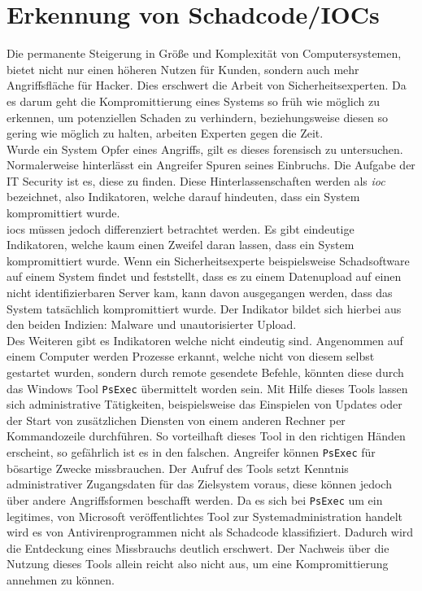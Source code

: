 \documentclass[
    12pt, %
    DIV10,
    ngerman, %
    a4paper, %
    oneside, %
    titlepage, %
    parskip=half, %
    headings=normal, %
    listof=totoc, %
    bibliography=totoc, %
    index=totoc, %
    captions=tableheading, %
    final %
]{scrreprt}
\begin{document}
\chapter{Erkennung von Schadcode/IOCs}\label{sec:ioc}
Die permanente Steigerung in Grö{\ss}e und Komplexität von Computersystemen, bietet nicht nur einen höheren Nutzen für Kunden, sondern auch mehr Angriffsfläche für Hacker. Dies erschwert die Arbeit von Sicherheitsexperten. Da es darum geht die Kompromittierung eines Systems so früh wie möglich zu erkennen, um potenziellen Schaden zu verhindern, beziehungsweise diesen so gering wie möglich zu halten, arbeiten Experten gegen die Zeit.\\
Wurde ein System Opfer eines Angriffs, gilt es dieses forensisch zu untersuchen. Normalerweise hinterlässt ein Angreifer Spuren seines Einbruchs. Die Aufgabe der IT Security ist es, diese zu finden. Diese Hinterlassenschaften werden als \emph{\acf{ioc}} bezeichnet, also Indikatoren, welche darauf hindeuten, dass ein System kompromittiert wurde.\\
%
\ac{iocs} müssen jedoch differenziert betrachtet werden. Es gibt eindeutige Indikatoren, welche kaum einen Zweifel daran lassen, dass ein System kompromittiert wurde. Wenn ein Sicherheitsexperte beispielsweise Schadsoftware auf einem System findet und feststellt, dass es zu einem Datenupload auf einen nicht identifizierbaren Server kam, kann davon ausgegangen werden, dass das System tatsächlich kompromittiert wurde. Der Indikator bildet sich hierbei aus den beiden Indizien: Malware und unautorisierter Upload.\\
Des Weiteren gibt es Indikatoren welche nicht eindeutig sind. Angenommen auf einem Computer werden Prozesse erkannt, welche nicht von diesem selbst gestartet wurden, sondern durch remote gesendete Befehle, könnten diese durch das Windows Tool \texttt{PsExec} übermittelt worden sein. Mit Hilfe dieses Tools lassen sich administrative Tätigkeiten, beispielsweise das Einspielen von Updates oder der Start von zusätzlichen Diensten von einem anderen Rechner per Kommandozeile durchführen. So vorteilhaft dieses Tool in den richtigen Händen erscheint, so gefährlich ist es in den falschen. Angreifer können \texttt{PsExec} für bösartige Zwecke missbrauchen. Der Aufruf des Tools setzt Kenntnis administrativer Zugangsdaten für das Zielsystem voraus, diese können jedoch über andere Angriffsformen beschafft werden. Da es sich bei \texttt{PsExec} um ein legitimes, von Microsoft veröffentlichtes Tool zur Systemadministration handelt wird es von Antivirenprogrammen nicht als Schadcode klassifiziert. Dadurch wird die Entdeckung eines Missbrauchs deutlich erschwert. Der Nachweis über die Nutzung dieses Tools allein reicht also nicht aus, um eine Kompromittierung annehmen zu können.
\end{document}
